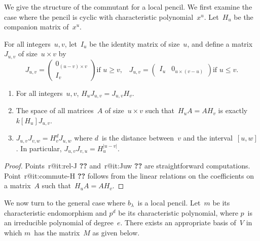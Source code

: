 \documentclass{article}%
\makeatletter
\def\labelenumi{(\roman{enumi})}
\def\itemref#1{\expandafter\ifx\csname r@#1\endcsname\relax
  {\bfseries ??}\else{\setcounter{enumi}{\ref{#1}}\labelenumi}\fi}
\def\abs#1{\left|#1\right|}
\def\mat#1{\begin{pmatrix}#1\end{pmatrix}}
\makeatother
\begin{document}
We give the structure of the commutant for a local pencil. We first
examine the case where the pencil is cyclic with characteristic
polynomial~$x^u$. Let~$H_u$ be the companion matrix of~$x^u$.

\begin{lem}\label{lem:commute-jordan}%
For all integers~$u, v$, let~$I_u$ be the identity matrix of size~$u$,
and define a matrix~$J_{u,v}$ of size~$u × v$ by
\begin{equation}
J_{u,v} = \mat{ 0_{(u-v)×v} \\ I^{}_v } \text{if~$u ≥ v$,}\quad
J_{u,v} = \mat{ I_{u} & 0_{u×(v-u)} } \text{if $u ≤ v$.}
\end{equation}
\begin{enumerate}
\item \label{it:rel-J} For all integers~$u, v$, $H_{u} J_{u,v} = J_{u,v} H_{v}$.
\item \label{it:commute-H} The space of all matrices~$A$ of size~$u × v$ such that~$H_u A = A
H_v$ is exactly $k[H_u] J_{u,v}$.
\item \label{it:Juw} $J_{u,v} J_{v,w} = H_v^{d} J_{u,w}^{}$ where $d$~is
the distance between~$v$ and the interval~$[u,w]$. In particular,
$J_{u,v} J_{v,u} = H_{u}^{\abs{u-v}}$.
\end{enumerate}
\end{lem}

\begin{proof}
Points~\itemref{it:rel-J} and~\itemref{it:Juw} are straightforward computations.
Point~\itemref{it:commute-H} follows from the linear relations on the
coefficients on a matrix~$A$ such that~$H_u A = A H_v$.
\end{proof}

We now turn to the general case where $b_{λ}$~is a local pencil. Let~$m$
be its characteristic endomorphism and $p^d$ be its characteristic
polynomial, where $p$~is an irreducible polynomial of degree~$e$. There
exists an appropriate basis of~$V$ in which $m$~has the matrix~$M$ as
given below.
\end{document}
